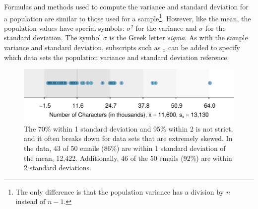 Formulas and methods used to compute the variance and standard deviation for a population are similar to those used for a sample\footnote{The only difference is that the population variance has a division by $n$ instead of $n-1$.}. However, like the mean, the population values have special symbols: $\sigma_{}^2$ for the variance and $\sigma$ for the standard deviation. The symbol $\sigma$  is the Greek letter \emph{sigma}. As with the sample variance and standard deviation, subscripts such as $_{x}^{}$ can be added to specify which data sets the population variance and standard deviation reference.
\begin{figure}
\centering
\includegraphics[width=\mycaptionwidth]{01/figures/sdAsRuleForEmailNumChar/sdAsRuleForEmailNumChar} %
\caption{The 70\% within 1 standard deviation and 95\% within 2 is not strict, and it often breaks down for data sets that are extremely skewed. In the  data, 43 of 50 emails (86\%) are within 1 standard deviation of the mean, 12,422. Additionally, 46 of the 50 emails (92\%) are within 2 standard deviations.}
\label{sdAsRuleForEmailNumChar}
\end{figure}

